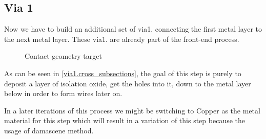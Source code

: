\subsection{Via 1}\label{chapter_via1}

Now we have to build an additional set of via1. connecting the first metal layer to the next metal layer.
These via1. are already part of the front-end process.

\begin{figure}[H]
	\centering
	\begin{tikzpicture}[node distance = 3cm, auto, thick,scale=\CrossSectionOnly, every node/.style={transform shape}]
		
	\end{tikzpicture}
	\caption{Contact geometry target}
	\label{via1.cross_subsections}
\end{figure}

As can be seen in \autoref{via1.cross_subsections}, the goal of this step is purely to deposit a layer of isolation oxide, get the holes into it, down to the metal layer below in order to form wires later on.

In a later iterations of this process we might be switching to Copper as the metal material for this step which will result in a variation of this step because the usage of damascene method.
